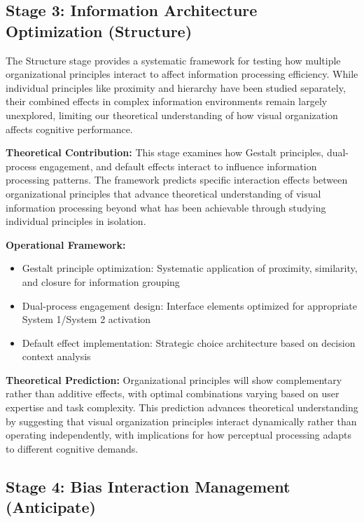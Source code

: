 \documentclass[
  authoryear,
  preprint]{elsarticle}
\providecommand{\tightlist}{%
  \setlength{\itemsep}{0pt}\setlength{\parskip}{0pt}}
\begin{document}
\subsection{Stage 3: Information Architecture Optimization
(Structure)}\label{stage-3-information-architecture-optimization-structure}

The Structure stage provides a systematic framework for testing how
multiple organizational principles interact to affect information
processing efficiency. While individual principles like proximity and
hierarchy have been studied separately, their combined effects in
complex information environments remain largely unexplored, limiting our
theoretical understanding of how visual organization affects cognitive
performance.

\textbf{Theoretical Contribution:} This stage examines how Gestalt
principles, dual-process engagement, and default effects interact to
influence information processing patterns. The framework predicts
specific interaction effects between organizational principles that
advance theoretical understanding of visual information processing
beyond what has been achievable through studying individual principles
in isolation.

\textbf{Operational Framework:}

\begin{itemize}
\tightlist
\item
  Gestalt principle optimization: Systematic application of proximity,
  similarity, and closure for information grouping
\item
  Dual-process engagement design: Interface elements optimized for
  appropriate System 1/System 2 activation
\item
  Default effect implementation: Strategic choice architecture based on
  decision context analysis
\end{itemize}

\textbf{Theoretical Prediction:} Organizational principles will show
complementary rather than additive effects, with optimal combinations
varying based on user expertise and task complexity. This prediction
advances theoretical understanding by suggesting that visual
organization principles interact dynamically rather than operating
independently, with implications for how perceptual processing adapts to
different cognitive demands.

\subsection{Stage 4: Bias Interaction Management
(Anticipate)}\label{stage-4-bias-interaction-management-anticipate}
\end{document}
